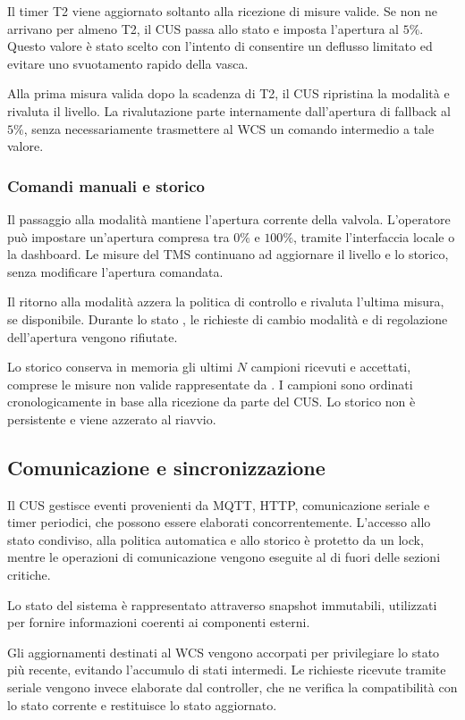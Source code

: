 Il timer T2 viene aggiornato soltanto alla ricezione di misure valide.
Se non ne arrivano per almeno T2, il CUS passa allo stato  e imposta l'apertura al \(5\%\).
Questo valore è stato scelto con l'intento di consentire un deflusso limitato ed evitare uno svuotamento rapido della vasca.

Alla prima misura valida dopo la scadenza di T2, il CUS ripristina la modalità  e rivaluta il livello.
La rivalutazione parte internamente dall'apertura di fallback al \(5\%\), senza necessariamente trasmettere al WCS un comando intermedio a tale valore.


\subsubsection{Comandi manuali e storico}
Il passaggio alla modalità  mantiene l'apertura corrente della valvola.
L'operatore può impostare un'apertura compresa tra \(0\%\) e \(100\%\), tramite l'interfaccia locale o la dashboard.
Le misure del TMS continuano ad aggiornare il livello e lo storico, senza modificare l'apertura comandata.

Il ritorno alla modalità  azzera la politica di controllo e rivaluta l'ultima misura, se disponibile.
Durante lo stato , le richieste di cambio modalità e di regolazione dell'apertura vengono rifiutate.

Lo storico conserva in memoria gli ultimi \(N\) campioni ricevuti e accettati, comprese le misure non valide rappresentate da .
I campioni sono ordinati cronologicamente in base alla ricezione da parte del CUS.
Lo storico non è persistente e viene azzerato al riavvio.


\subsection{Comunicazione e sincronizzazione}
Il CUS gestisce eventi provenienti da MQTT, HTTP, comunicazione seriale e timer periodici, che possono essere elaborati concorrentemente.
L'accesso allo stato condiviso, alla politica automatica e allo storico è protetto da un lock, mentre le operazioni di comunicazione vengono eseguite al di fuori delle sezioni critiche.

Lo stato del sistema è rappresentato attraverso snapshot immutabili, utilizzati per fornire informazioni coerenti ai componenti esterni.

Gli aggiornamenti destinati al WCS vengono accorpati per privilegiare lo stato più recente, evitando l'accumulo di stati intermedi.
Le richieste ricevute tramite seriale vengono invece elaborate dal controller, che ne verifica la compatibilità con lo stato corrente e restituisce lo stato aggiornato.



